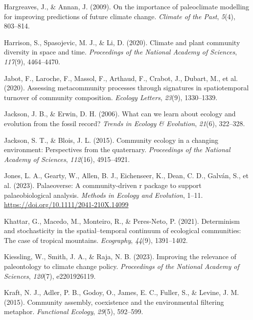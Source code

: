 \documentclass[
]{agujournal2019}
\newlength{\cslhangindent}
\newenvironment{CSLReferences}[2] %
 {\begin{list}{}{%
  \setlength{\itemindent}{0pt}
  \setlength{\leftmargin}{0pt}
  \setlength{\parsep}{0pt}
  \ifodd #1
   \setlength{\leftmargin}{\cslhangindent}
   \setlength{\itemindent}{-1\cslhangindent}
  \fi
  \setlength{\itemsep}{#2\baselineskip}}}
 {\end{list}}
\begin{document}
\begin{CSLReferences}{1}{0}
Hargreaves, J., \& Annan, J. (2009). On the importance of paleoclimate
modelling for improving predictions of future climate change.
\emph{Climate of the Past}, \emph{5}(4), 803--814.

Harrison, S., Spasojevic, M. J., \& Li, D. (2020). Climate and plant
community diversity in space and time. \emph{Proceedings of the National
Academy of Sciences}, \emph{117}(9), 4464--4470.

Jabot, F., Laroche, F., Massol, F., Arthaud, F., Crabot, J., Dubart, M.,
et al. (2020). Assessing metacommunity processes through signatures in
spatiotemporal turnover of community composition. \emph{Ecology
Letters}, \emph{23}(9), 1330--1339.

Jackson, J. B., \& Erwin, D. H. (2006). What can we learn about ecology
and evolution from the fossil record? \emph{Trends in Ecology \&
Evolution}, \emph{21}(6), 322--328.

Jackson, S. T., \& Blois, J. L. (2015). Community ecology in a changing
environment: Perspectives from the quaternary. \emph{Proceedings of the
National Academy of Sciences}, \emph{112}(16), 4915--4921.

Jones, L. A., Gearty, W., Allen, B. J., Eichenseer, K., Dean, C. D.,
Galván, S., et al. (2023). Palaeoverse: A community-driven r package to
support palaeobiological analysis. \emph{Methods in Ecology and
Evolution}, 1--11. \url{https://doi.org/10.1111/2041-210X.14099}

Khattar, G., Macedo, M., Monteiro, R., \& Peres-Neto, P. (2021).
Determinism and stochasticity in the spatial--temporal continuum of
ecological communities: The case of tropical mountains.
\emph{Ecography}, \emph{44}(9), 1391--1402.

Kiessling, W., Smith, J. A., \& Raja, N. B. (2023). Improving the
relevance of paleontology to climate change policy. \emph{Proceedings of
the National Academy of Sciences}, \emph{120}(7), e2201926119.

Kraft, N. J., Adler, P. B., Godoy, O., James, E. C., Fuller, S., \&
Levine, J. M. (2015). Community assembly, coexistence and the
environmental filtering metaphor. \emph{Functional Ecology},
\emph{29}(5), 592--599.


\end{CSLReferences}
\end{document}
